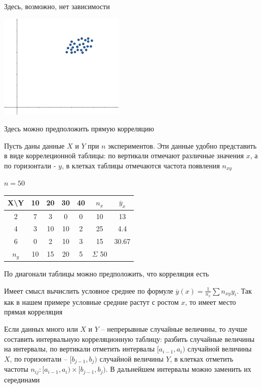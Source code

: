 \documentclass[12pt]{article}
\begin{document}
\begin{enumerate}
\begin{multicols}{2}
\begin{center}
            Здесь, возможно, нет зависимости

            \includegraphics[height=5cm]{mathstat/images/mathstat_2025_04_01_2}

            Здесь можно предположить прямую корреляцию
        \end{center}
    \end{multicols}

    Пусть даны данные $X$ и $Y$ при $n$ экспериментов. Эти данные удобно представить в виде коррелеционной таблицы:
    по вертикали отмечают различные значения $x$, а по горизонтали - $y$, в клетках таблицы отмечаются частота появления $n_{xy}$

    \Ex $n = 50$

    \smallvspace

    \begin{tabular}{c|c|c|c|c|c|c}
        X\backslash Y & 10 & 20 & 30 & 40 & $n_x$ & $\overline y_x$ \\
        \hline
        2 & 7 & 3 & 0 & 0 & 10 & 13 \\
        \hline
        4 & 3 & 10 & 10 & 2 & 25 & 4.4 \\
        \hline
        6 & 0 & 2 & 10 & 3 & 15 & 30.67 \\
        \hline
        $n_y$ & 10 & 15 & 20 & 5 & $\Sigma$ 50 & \\
    \end{tabular}

    \smallvspace

    По диагонали таблицы можно предположить, что корреляция есть

    Имеет смысл вычислить условное среднее по формуле $\overline y (x) = \frac{1}{n_x} \sum n_{xy} y_i$. Так как в нашем примере
    условные средние растут с ростом $x$, то имеет место прямая корреляция

    \Notas Если данных много или $X$ и $Y$ -- непрерывные случайные величины, то лучше составить интервальную корреляционную таблицу:
    разбить случайные величины на интервалы, по вертикали отметить интервалы $[a_{i - 1}, a_i)$ случайной величины $X$, 
    по горизонтали -- $[b_{j - 1}, b_j)$ случайной величины $Y$, в клетках 
    отметить частоты $n_{ij} : [a_{i - 1}, a_i) \times [b_{j - 1}, b_j)$. В дальнейшем интервалы можно заменить их серединами


\end{enumerate}
\end{document}
